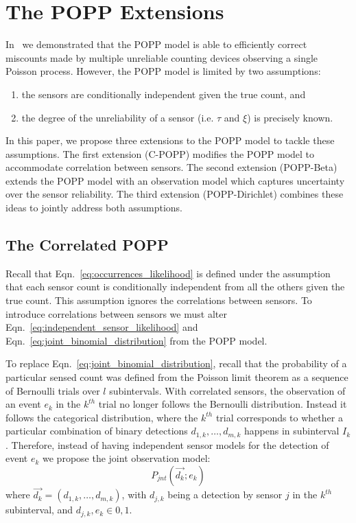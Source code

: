 
\section{The POPP Extensions}
\label{sec:popp_extensions}

In~\cite{jovan18a} we demonstrated that the POPP model is able to efficiently correct miscounts made by multiple unreliable counting devices observing a single Poisson process. However, the POPP model is limited by two assumptions:
\begin{enumerate}
    \item the sensors are conditionally independent given the true count, and 
    \item the degree of the unreliability of a sensor (i.e. $\tau$ and $\xi$) is precisely known.
\end{enumerate}
In this paper, we propose three extensions to the POPP model to tackle these assumptions. The first extension (C-POPP) modifies the POPP model to accommodate correlation between sensors. The second extension (POPP-Beta) extends the POPP model with an observation model which captures uncertainty over the sensor reliability. The third extension (POPP-Dirichlet) combines these ideas to jointly address both assumptions. 

\subsection{The Correlated POPP}
\label{subsec:cpop}

Recall that Eqn.~\ref{eq:occurrences_likelihood} is defined under the assumption that each sensor count is conditionally independent from all the others given the true count. This assumption ignores the correlations between sensors. 
% 
To introduce correlations between sensors we must alter Eqn.~\ref{eq:independent_sensor_likelihood} and
Eqn.~\ref{eq:joint_binomial_distribution} from the POPP model.


To replace Eqn.~\ref{eq:joint_binomial_distribution}, recall that the probability of a particular sensed count was defined from the Poisson limit theorem as a sequence of Bernoulli trials over $l$ subintervals.
% 
With correlated sensors, the observation of an event $e_k$ in the 
$k^{th}$ trial no longer follows the Bernoulli distribution. Instead it follows the categorical distribution, where the $k^{th}$ trial corresponds to whether a particular combination of binary detections $d_{1,k}, \ldots, d_{m,k}$ happens in subinterval $I_k$. Therefore, instead of having independent sensor models for the detection of event $e_k$ we propose the joint observation model:
\begin{equation}
    \label{eq:joint_sensor_model}
    P_{jnt}(\vec{d_k} ; e_k)
\end{equation}    
\noindent where $ \vec{d_k} = (d_{1,k}, \ldots, d_{m,k})$, with $d_{j,k}$ being a detection by sensor $j$ in the $k^{th}$ subinterval, and $d_{j,k}, e_k \in {0, 1}$. 

